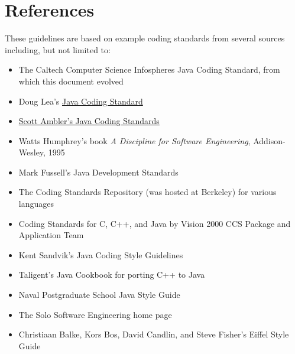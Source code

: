 \documentclass[10pt,letter]{article}
\begin{document}
\section{References}
These guidelines are based on example coding standards from several sources including, but not limited to:
\begin{itemize}
  \item The Caltech Computer Science Infospheres Java Coding Standard, from which this document evolved
  \item Doug Lea's \href{https://gee.cs.oswego.edu/dl/html/javaCodingStd.html}{Java Coding Standard}
  \item \href{https://ambysoft.com/essays/javacodingstandards.html}{Scott Ambler's Java Coding Standards}
  \item Watts Humphrey's book \emph{A Discipline for Software Engineering}, Addison-Wesley, 1995
  \item Mark Fussell's Java Development Standards
  \item The Coding Standards Repository (was hosted at Berkeley) for various languages
  \item Coding Standards for C, C++, and Java by Vision 2000 CCS Package and Application Team
  \item Kent Sandvik's Java Coding Style Guidelines
  \item Taligent's Java Cookbook for porting C++ to Java
  \item Naval Postgraduate School Java Style Guide
  \item The Solo Software Engineering home page
  \item Christiaan Balke, Kors Bos, David Candlin, and Steve Fisher's Eiffel Style Guide
\end{itemize}
\end{document}

